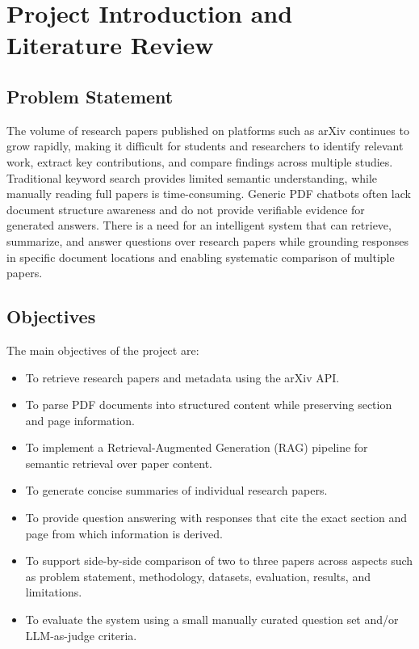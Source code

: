 \chapter{Project Introduction and Literature Review}

\section{Problem Statement}
The volume of research papers published on platforms such as arXiv continues to grow rapidly, making it difficult for students and researchers to identify relevant work, extract key contributions, and compare findings across multiple studies. Traditional keyword search provides limited semantic understanding, while manually reading full papers is time-consuming. Generic PDF chatbots often lack document structure awareness and do not provide verifiable evidence for generated answers. There is a need for an intelligent system that can retrieve, summarize, and answer questions over research papers while grounding responses in specific document locations and enabling systematic comparison of multiple papers.

\section{Objectives}
The main objectives of the project are:
\begin{itemize}
    \item To retrieve research papers and metadata using the arXiv API.
    \item To parse PDF documents into structured content while preserving section and page information.
    \item To implement a Retrieval-Augmented Generation (RAG) pipeline for semantic retrieval over paper content.
    \item To generate concise summaries of individual research papers.
    \item To provide question answering with responses that cite the exact section and page from which information is derived.
    \item To support side-by-side comparison of two to three papers across aspects such as problem statement, methodology, datasets, evaluation, results, and limitations.
    \item To evaluate the system using a small manually curated question set and/or LLM-as-judge criteria.
\end{itemize}


